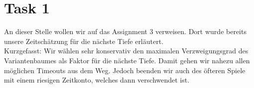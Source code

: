 \section*{Task 1}
An dieser Stelle wollen wir auf das Assignment 3 verweisen. Dort wurde bereits unsere Zeitschätzung für die nächste Tiefe erläutert.\\
Kurzgefasst: Wir wählen sehr konservativ den maximalen Verzweigungsgrad des Variantenbaumes als Faktor für die nächste Tiefe. Damit gehen wir nahezu allen möglichen Timeouts aus dem Weg. Jedoch beenden wir auch des öfteren Spiele mit einem riesigen Zeitkonto, welches dann verschwendet ist.